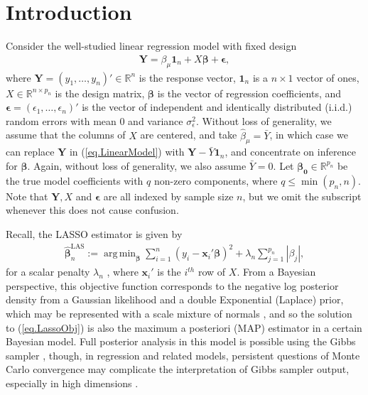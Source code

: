 \documentclass[ejs,authoryear,linksfromyear]{imsart}
\DeclareMathOperator*{\argmin}{arg\,min} %
\newcommand{\sumin}{\sum_{i=1}^n} %
\newcommand{\bLAS}{\widehat{\bm{\beta}}_n^{\text{LAS}}} %
\numberwithin{equation}{section}
\theoremstyle{plain}
\begin{document}
	
\section{Introduction}

Consider the well-studied linear regression model with fixed design 
\begin{align} 
\label{eq.LinearModel}
\bm{Y} = \beta_{\mu} \bm{1}_n + X \bm{\beta} + \bm{\epsilon},
\end{align}
where $\bm{Y} = (y_1, \ldots, y_n)' \in \mathbb{R}^n$ is the response vector, $\bm{1}_n$ is a $n \times 1$ vector of ones, $X \in \mathbb{R}^{n \times p_n}$ is the design matrix, $\bm{\beta}$ is the vector of regression coefficients, and $\bm{\epsilon} = (\epsilon_1, \ldots, \epsilon_n)'$ is the vector of independent and identically distributed (i.i.d.) random errors with mean 0 and variance $\sigma^2_{\epsilon}$. Without loss of generality, we assume that the columns of $X$ are centered, and take $\widehat{\beta}_{\mu} = \bar{Y}$, in which case we can replace $\bm{Y}$ in (\ref{eq.LinearModel}) with $\bm{Y} - \bar{Y} \bm{1}_n$, and concentrate on inference for $\bm{\beta}$. Again, without loss of generality, we also assume $\bar{Y} =0$. Let $\bm{\beta_0} \in \mathbb{R}^{p_n}$ be the true model coefficients with $q$ non-zero components, where $q \leq \min(p_n, n)$. Note that $\bm{Y}, X$ and $\bm{\epsilon}$ are all indexed by sample size $n$, but we omit the subscript whenever this does not cause confusion. 

Recall, the LASSO estimator is given by 
\begin{align} \label{eq.LassoObj}
\bLAS
:= \argmin_{\bm{\beta}} 
\sumin ( y_i - \bm{x}_i' \bm{\beta} )^2 
+ \lambda_n \sum_{j=1}^{p_n} |\beta_j|,
\end{align}   
for a scalar penalty $\lambda_n$ \citep{Lasso}, where $\bm{x}_i'$ is the $i^{th}$ row of $X$. From a Bayesian perspective, this objective function corresponds to the negative log posterior density from a Gaussian likelihood and a double Exponential (Laplace) prior, which may be represented with a scale mixture of normals \citep{ScaleMixtureNormal}, and so the solution to (\ref{eq.LassoObj}) is also 
the maximum a posteriori (MAP) estimator  in a certain Bayesian model. Full
posterior analysis in this model is possible using the Gibbs sampler \citep{BayesianLasso}, though, in regression and related models, persistent questions
of Monte Carlo convergence may complicate the interpretation of Gibbs sampler output, especially in high dimensions \citep[e.g.,][]{WellingTeh,rajaratnam2015mcmc,robert2018accelerating,qin2019convergence}.
\end{document}
